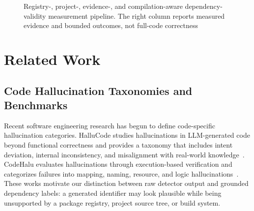 \documentclass[pdflatex,sn-basic]{sn-jnl}
\newcommand{\codeid}[1]{\texttt{\detokenize{#1}}}
\begin{document}
\begin{figure}[htbp]
\caption{Registry-, project-, evidence-, and compilation-aware dependency-validity measurement pipeline. The right column reports measured evidence and bounded outcomes, not full-code correctness}
\label{fig:pipeline}
\end{figure}

\section{Related Work}

\subsection{Code Hallucination Taxonomies and Benchmarks}

Recent software engineering research has begun to define code-specific hallucination categories. HalluCode studies hallucinations in LLM-generated code beyond functional correctness and provides a taxonomy that includes intent deviation, internal inconsistency, and misalignment with real-world knowledge~\citep{Liu2024HalluCode}. CodeHalu evaluates hallucinations through execution-based verification and categorizes failures into mapping, naming, resource, and logic hallucinations~\citep{Tian2025CodeHalu}. These works motivate our distinction between raw detector output and grounded dependency labels: a generated identifier may look plausible while being unsupported by a package registry, project source tree, or build system.
\end{document}
